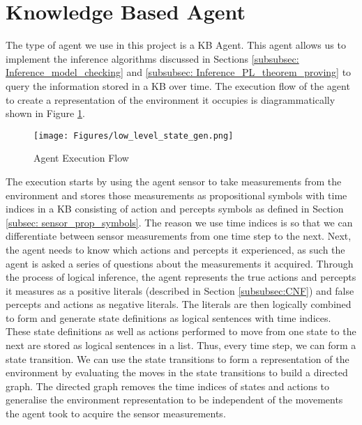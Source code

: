 
\section{Knowledge Based Agent}

The type of agent we use in this project is a KB Agent. This agent allows us to implement the inference algorithms discussed in Sections \ref{subsubsec: Inference_model_checking} and \ref{subsubsec: Inference_PL_theorem_proving} to query the information stored in a KB over time. The execution flow of the agent to create a representation of the environment it occupies is diagrammatically shown in Figure \ref{fig:agent_in_env_low_level}.

\begin{figure}[H]
    \centering
    \texttt{[image: Figures/low\_level\_state\_gen.png]}
    \caption{Agent Execution Flow} 
    \label{fig:agent_in_env_low_level}
\end{figure}

The execution starts by using the agent sensor to take measurements from the environment and stores those measurements as propositional symbols with time indices in a KB consisting of action and percepts symbols as defined in Section \ref{subsec: sensor_prop_symbols}. The reason we use time indices is so that we can differentiate between sensor measurements from one time step to the next. Next, the agent needs to know which actions and percepts it experienced, as such the agent is asked a series of questions about the measurements it acquired. Through the process of logical inference, the agent represents the true actions and percepts it measures as a positive literals (described in Section \ref{subsubsec:CNF}) and false percepts and actions as negative literals. The literals are then logically combined to form and generate state definitions as logical sentences with time indices. These state definitions as well as actions performed to move from one state to the next are stored as logical sentences in a list. Thus, every time step, we can form a state transition. We can use the state transitions to form a representation of the environment by evaluating the moves in the state transitions to build a directed graph. The directed graph removes the time indices of states and actions to generalise the environment representation to be independent of the movements the agent took to acquire the sensor measurements.


